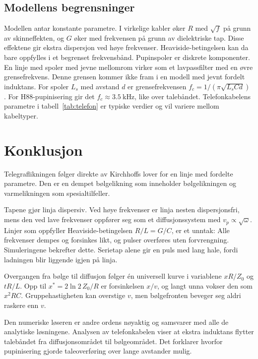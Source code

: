 \documentclass[11pt,a4paper]{article}
\numberwithin{equation}{section}
\numberwithin{figure}{section}
\numberwithin{table}{section}
\begin{document}
\subsection{Modellens begrensninger}
Modellen antar konstante parametre. I virkelige kabler øker $R$ med
$\sqrt{f}$ på grunn av skinneffekten, og $G$ øker med frekvensen på grunn av
dielektriske tap. Disse effektene gir ekstra dispersjon ved høye frekvenser.
Heaviside-betingelsen kan da bare oppfylles i et begrenset frekvensbånd. Pupinspoler
er diskrete komponenter. En linje med spoler med jevne mellomrom virker som et
lavpassfilter med en øvre grensefrekvens. Denne grensen kommer ikke fram i en
modell med jevnt fordelt induktans. For spoler $L_s$ med avstand $d$ er
grensefrekvensen $f_c = 1/(\pi\sqrt{L_sCd})$ \cite{pozar2012}. For H88-pupinisering
gir det $f_c \approx \SI{3.5}{\kilo\hertz}$, like over talebåndet. Telefonkabelens parametre i tabell~\ref{tab:telefon}
er typiske verdier og vil variere mellom kabeltyper.

\section{Konklusjon}\label{sec:konklusjon}

Telegraflikningen følger direkte av Kirchhoffs lover for en linje med fordelte
parametre. Den er en dempet bølgelikning som inneholder bølgelikningen og
varmelikningen som spesialtilfeller.

Tapene gjør linja dispersiv. Ved høye frekvenser er linja nesten
dispersjonsfri, mens den ved lave frekvenser oppfører seg som et
diffusjonssystem med $v_p \propto \sqrt{\omega}$. Linjer som oppfyller
Heaviside-betingelsen $R/L = G/C$, er et unntak: Alle frekvenser dempes og
forsinkes likt, og pulser overføres uten forvrengning. Simuleringene bekrefter
dette. Serietap alene gir en puls med lang hale, fordi ladningen blir liggende
igjen på linja.

Overgangen fra bølge til diffusjon følger én universell kurve i variablene
$xR/Z_0$ og $tR/L$. Opp til $x^* = 2\ln 2\,Z_0/R$ er forsinkelsen $x/v$, og langt
unna vokser den som $x^2RC$. Gruppehastigheten kan overstige $v$, men
bølgefronten beveger seg aldri raskere enn $v$.

Den numeriske løseren er andre ordens nøyaktig og samsvarer med alle de
analytiske løsningene. Analysen av telefonkabelen viser at ekstra induktans
flytter talebåndet fra diffusjonsområdet til bølgeområdet. Det forklarer hvorfor
pupinisering gjorde taleoverføring over lange avstander mulig.
\end{document}
